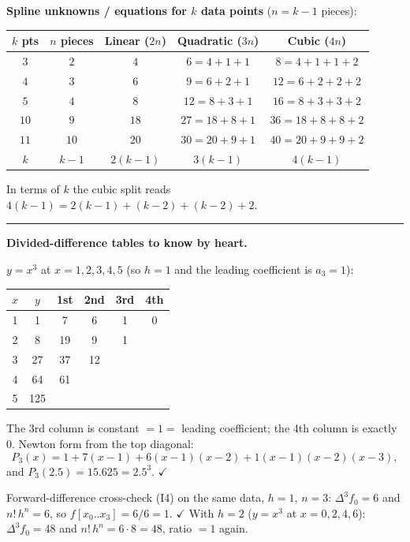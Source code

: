 \begin{numbox}
\textbf{Spline unknowns / equations for $k$ data points} ($n=k-1$ pieces):
\begin{center}\small
\begin{tabular}{@{}ccccc@{}}
\toprule
$k$ pts & $n$ pieces & Linear ($2n$) & Quadratic ($3n$) & Cubic ($4n$) \\
\midrule
$3$  & $2$  & $4$  & $6=4+1+1$   & $8=4+1+1+2$ \\
$4$  & $3$  & $6$  & $9=6+2+1$   & $12=6+2+2+2$ \\
$5$  & $4$  & $8$  & $12=8+3+1$  & $16=8+3+3+2$ \\
$10$ & $9$  & $18$ & $27=18+8+1$ & $36=18+8+8+2$ \\
$11$ & $10$ & $20$ & $30=20+9+1$ & $40=20+9+9+2$ \\
\midrule
$k$ & $k-1$ & $2(k-1)$ & $3(k-1)$ & $4(k-1)$ \\
\bottomrule
\end{tabular}
\end{center}
In terms of $k$ the cubic split reads
$4(k-1)=2(k-1)+(k-2)+(k-2)+2$.

\medskip\hrule\medskip
\textbf{Divided-difference tables to know by heart.}

$y=x^3$ at $x=1,2,3,4,5$ (so $h=1$ and the leading coefficient is $a_3=1$):
\begin{center}\small
\begin{tabular}{@{}cccccc@{}}
\toprule
$x$ & $y$ & 1st & 2nd & 3rd & 4th \\
\midrule
1 & 1   & 7  & 6  & 1 & 0 \\
2 & 8   & 19 & 9  & 1 &   \\
3 & 27  & 37 & 12 &   &   \\
4 & 64  & 61 &    &   &   \\
5 & 125 &    &    &   &   \\
\bottomrule
\end{tabular}
\end{center}
The 3rd column is constant $=1=$ leading coefficient; the 4th column is exactly $0$.
Newton form from the top diagonal:
\[
  P_3(x)=1+7(x-1)+6(x-1)(x-2)+1(x-1)(x-2)(x-3),
\]
and $P_3(2.5)=15.625=2.5^3$. $\checkmark$

\medskip
Forward-difference cross-check (I4) on the same data, $h=1$, $n=3$:
$\Delta^3 f_0=6$ and $n!\,h^n=6$, so $f[x_0..x_3]=6/6=1$. $\checkmark$
With $h=2$ ($y=x^3$ at $x=0,2,4,6$): $\Delta^3 f_0=48$ and $n!\,h^n=6\cdot8=48$,
ratio $=1$ again.


\end{numbox}
